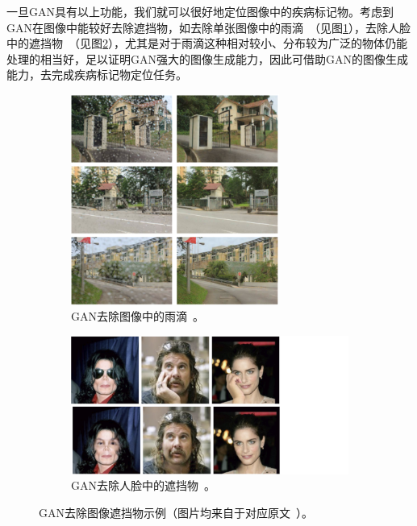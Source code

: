 \noindent 一旦GAN具有以上功能，我们就可以很好地定位图像中的疾病标记物。考虑到GAN在图像中能较好去除遮挡物，如去除单张图像中的雨滴~\cite{qian2018attentive}（见图\ref{subfig:attention_gan}），去除人脸中的遮挡物~\cite{yuan2019face}（见图\ref{subfig:face_de_occulusion}），尤其是对于雨滴这种相对较小、分布较为广泛的物体仍能处理的相当好，足以证明GAN强大的图像生成能力，因此可借助GAN的图像生成能力，去完成疾病标记物定位任务。
\begin{figure}[h!]
	\begin{subfigure}{0.45\textwidth}
		\centering
		\includegraphics[width=0.75\textwidth]{figure/attention_gan_example.png}
		\caption{GAN去除图像中的雨滴~\cite{qian2018attentive}。}
		\label{subfig:attention_gan}
	\end{subfigure}
	\begin{subfigure}{0.45\textwidth}
		\centering
		\includegraphics[width=1.5\textwidth]{figure/face_de_occulusion.png}
		\caption{GAN去除人脸中的遮挡物~\cite{yuan2019face}。}
		\label{subfig:face_de_occulusion}
	\end{subfigure}
	\caption[GAN去除图像遮挡物示例]{GAN去除图像遮挡物示例（图片均来自于对应原文~\cite{qian2018attentive,yuan2019face}）。}
	\label{mul_fig:gan_auto_encoder_example}
\end{figure}

